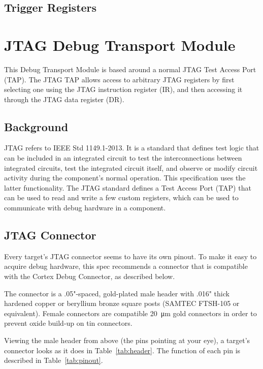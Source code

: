 \documentclass{article}
\begin{document}
\subsection{Trigger Registers}



\section{JTAG Debug Transport Module} \label{jtagdtm}

This Debug Transport Module is based around a normal JTAG Test Access Port
(TAP).  The JTAG TAP allows access to arbitrary JTAG registers by first
selecting one using the JTAG instruction register (IR), and then accessing it
through the JTAG data register (DR).

\subsection{Background}

JTAG refers to IEEE Std 1149.1-2013. It is a standard that defines test logic
that can be included in an integrated circuit to test the interconnections
between integrated circuits, test the integrated circuit itself, and observe or
modify circuit activity during the component’s normal operation.
This specification uses the latter functionality.
The JTAG standard defines a Test Access Port (TAP) that
can be used to read and write a few custom registers, which can be used to
communicate with debug hardware in a component.

\subsection{JTAG Connector}

Every target's JTAG connector seems to have its own pinout. To make it easy to
acquire debug hardware, this spec recommends a connector that is compatible
with the Cortex Debug Connector, as described below.

The connector is a .05"-spaced, gold-plated male header with .016" thick
hardened copper or beryllium bronze square posts (SAMTEC FTSH-105 or
equivalent). Female connectors are compatible \SI{20}{\micro\metre} gold
connectors in order to prevent oxide build-up on tin connectors.

Viewing the male header from above (the pins pointing at your eye), a target's
connector looks as it does in Table~\ref{tab:header}. The function of each pin
is described in Table~\ref{tab:pinout}.
\end{document}

